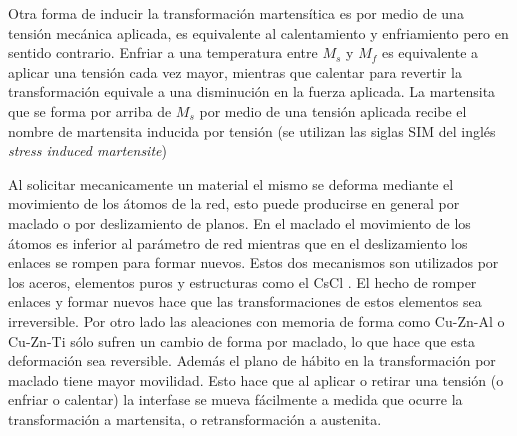\documentclass[a4paper,12pt,fleqn,twoside,openany]{book}
\begin{document}

Otra forma de inducir la transformación martensítica es por medio de una tensión mecánica aplicada, es equivalente al calentamiento y enfriamiento pero en 
sentido contrario. Enfriar a una temperatura entre $M_{s}$ y $M_{f}$ es equivalente a aplicar una tensión cada vez mayor, mientras que calentar para revertir la 
transformación equivale a una disminución en la fuerza aplicada. La martensita que se forma por arriba de $M_{s}$ por medio de una 
tensión aplicada recibe el nombre de martensita inducida por tensión (se utilizan las siglas SIM del inglés \textit{stress induced martensite})

  

Al solicitar mecanicamente un material el mismo se deforma mediante el movimiento de los átomos de la red, esto puede producirse en general por maclado o por deslizamiento de planos. En el maclado el movimiento de los átomos es inferior al parámetro de red mientras que en el deslizamiento los enlaces se rompen para formar nuevos. 
Estos dos mecanismos son utilizados por los aceros, 
elementos puros y estructuras como el CsCl \cite{duering, elliott}. El hecho de romper enlaces y formar nuevos hace que las transformaciones de estos 
elementos sea irreversible. Por otro lado las aleaciones con memoria de forma como Cu-Zn-Al o Cu-Zn-Ti sólo sufren un cambio de forma por maclado, lo que hace que esta deformación sea reversible. Además el plano de hábito en la transformación por maclado tiene mayor movilidad. Esto hace que al aplicar o retirar una tensión (o enfriar o calentar) la interfase se mueva fácilmente a medida que ocurre la transformación a martensita, o retransformación a austenita.

\end{document}
